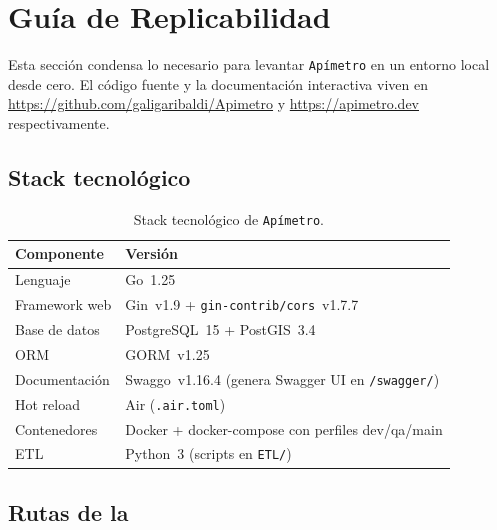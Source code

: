 
\section{Guía de Replicabilidad}
\label{anx:apimetro-replicabilidad}

Esta sección condensa lo necesario para levantar \texttt{Apímetro} en un entorno
local desde cero. El código fuente y la documentación interactiva viven en
\url{https://github.com/galigaribaldi/Apimetro} y \url{https://apimetro.dev}
respectivamente.

\subsection*{Stack tecnológico}

\begin{table}[H]
    \centering
    \small
    \begin{tabular}{|l|l|}
        \hline
        \textbf{Componente} & \textbf{Versión} \\ \hline
        Lenguaje            & Go~1.25 \\ \hline
        Framework web       & Gin~v1.9 + \texttt{gin-contrib/cors}~v1.7.7 \\ \hline
        Base de datos       & PostgreSQL~15 + PostGIS~3.4 \\ \hline
        ORM                 & GORM~v1.25 \\ \hline
        Documentación       & Swaggo~v1.16.4 (genera Swagger UI en \texttt{/swagger/}) \\ \hline
        Hot reload          & Air (\texttt{.air.toml}) \\ \hline
        Contenedores        & Docker + docker-compose con perfiles dev/qa/main \\ \hline
        ETL                 & Python~3 (scripts en \texttt{ETL/}) \\ \hline
    \end{tabular}
    \caption{Stack tecnológico de \texttt{Apímetro}.}
    \label{tab:stack-apimetro}
\end{table}

\subsection*{Rutas de la \api{}}

